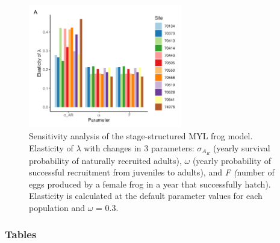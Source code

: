 \documentclass[9pt,twoside,lineno]{pnas-new}
\begin{document}
\begin{figure}

{\centering \includegraphics[width=0.60\textwidth]{figures/pop_viability_figures_for_supp.jpg}

}

\caption{\label{fig-viability-supp}Sensitivity analysis of the
stage-structured MYL frog model. Elasticity of \(\lambda\) with changes
in 3 parameters: \(\sigma_{A_R}\) (yearly survival probability of
naturally recruited adults), \(\omega\) (yearly probability of
successful recruitment from juveniles to adults), and \emph{F (}number
of eggs produced by a female frog in a year that successfully hatch).
Elasticity is calculated at the default parameter values for each
population and \(\omega\) = 0.3.}

\end{figure}\clearpage

\newpage

\hypertarget{tables}{%
\subsubsection{Tables}\label{tables}}

\hfill\break
\end{document}
